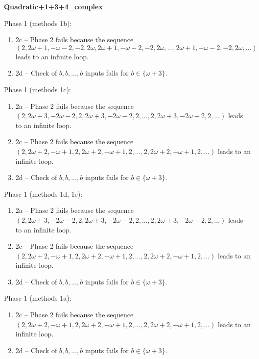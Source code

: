 \begin{exmp}
\label{ex:compareAM}

\textbf{Quadratic+1+3+4\_complex}

Phase 1 (methods 1b):
\begin{enumerate}[ ]
\item  2c -- Phase 2   fails because  the sequence $(2, 2\omega + 1, -\omega - 2, -2, 2\omega, 2\omega + 1, -\omega - 2, -2, 2\omega, \dots ,2\omega + 1, -\omega - 2, -2, 2\omega, \dots)$ leads to an infinite loop.
\item  2d -- Check of $b,b,\dots,b$ inputs fails for $b\in \{\omega + 3\}$.
\end{enumerate}


Phase 1 (methods 1c):
\begin{enumerate}[ ]
\item  2a -- Phase 2   fails because  the sequence $(2, 2\omega + 3, -2\omega - 2, 2, 2\omega + 3, -2\omega - 2, 2, \dots ,2, 2\omega + 3, -2\omega - 2, 2, \dots)$ leads to an infinite loop.
\item  2c -- Phase 2   fails because  the sequence $(2, 2\omega + 2, -\omega + 1, 2, 2\omega + 2, -\omega + 1, 2, \dots ,2, 2\omega + 2, -\omega + 1, 2, \dots)$ leads to an infinite loop.
\item  2d -- Check of $b,b,\dots,b$ inputs fails for $b\in \{\omega + 3\}$.
\end{enumerate}


Phase 1 (methods 1d, 1e):
\begin{enumerate}[ ]
\item  2a -- Phase 2   fails because  the sequence $(2, 2\omega + 3, -2\omega - 2, 2, 2\omega + 3, -2\omega - 2, 2, \dots ,2, 2\omega + 3, -2\omega - 2, 2, \dots)$ leads to an infinite loop.
\item  2c -- Phase 2   fails because  the sequence $(2, 2\omega + 2, -\omega + 1, 2, 2\omega + 2, -\omega + 1, 2, \dots ,2, 2\omega + 2, -\omega + 1, 2, \dots)$ leads to an infinite loop.
\item  2d -- Check of $b,b,\dots,b$ inputs fails for $b\in \{\omega + 3\}$.
\end{enumerate}


Phase 1 (methods 1a):
\begin{enumerate}[ ]
\item  2c -- Phase 2   fails because  the sequence $(2, 2\omega + 2, -\omega + 1, 2, 2\omega + 2, -\omega + 1, 2, \dots ,2, 2\omega + 2, -\omega + 1, 2, \dots)$ leads to an infinite loop.
\item  2d -- Check of $b,b,\dots,b$ inputs fails for $b\in \{\omega + 3\}$.
\end{enumerate}


\end{exmp}




